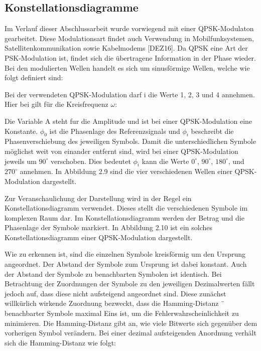 \subsection{Konstellationsdiagramme}
\label{subsec:Unterabschnitt1}

Im Verlauf dieser Abschlussarbeit wurde vorwiegend mit einer QPSK-Modulaton gearbeitet. Diese Modulationsart findet auch Verwendung in Mobilfunksystemen, Satellitenkommunikation sowie Kabelmodems [DEZ16]. Da QPSK eine Art der PSK-Modulation
ist, findet sich die übertragene Information in der Phase wieder. Bei den modulierten Wellen handelt es sich um sinusförmige Wellen, welche wie folgt definiert sind:


Bei der verwendeten QPSK-Modulation darf i die Werte {1, 2, 3 und 4} annehmen. Hier
bei gilt für die Kreisfrequenz $\omega$:


Die Variable A steht fur die Amplitude und ist bei einer QPSK-Modulation eine Konstante.
$\phi_0$ ist die Phasenlage des Referenzsignals und $\phi_i$ beschreibt die Phasenverschiebung des
jeweiligen Symbols. Damit die unterschiedlichen Symbole möglichst weit von einander
entfernt sind, wird bei einer QPSK-Modulation jeweils um $90^\circ$ verschoben. Dies bedeutet
$\phi_i$ kann die Werte $0^\circ$, $90^\circ$, $180^\circ$, und $270^\circ$ annehmen. In Abbildung 2.9 sind die vier verschiedenen Wellen einer QPSK-Modulation dargestellt.


Zur Veranschaulichung der Darstellung wird in der Regel ein Konstellationsdiagramm verwendet. Dieses stellt die verschiedenen Symbole im komplexen Raum dar. Im Konstellationsdiagramm werden der Betrag und die Phasenlage der Symbole markiert. In Abbildung
2.10 ist ein solches Konstellationsdiagramm einer QPSK-Modulation dargestellt.

Wie zu erkennen ist, sind die einzelnen Symbole kreisförmig um den Ursprung angeordnet.
Der Abstand der Symbole zum Ursprung ist dabei konstant. Auch der Abstand der Symbole zu benachbarten Symbolen ist identisch. Bei Betrachtung der Zuordnungen der Symbole
zu den jeweiligen Dezimalwerten fällt jedoch auf, dass diese nicht aufsteigend angeordnet
sind. Diese zunächst willkürlich wirkende Zuordnung bezweckt, dass die Hamming-Distanz ¨
benachbarter Symbole maximal Eins ist, um die Fehlerwahrscheinlichkeit zu minimieren.
Die Hamming-Distanz gibt an, wie viele Bitwerte sich gegenüber dem vorherigen Symbol verändern. Bei einer dezimal aufsteigenden Anordnung verhält sich die Hamming-Distanz
wie folgt:




